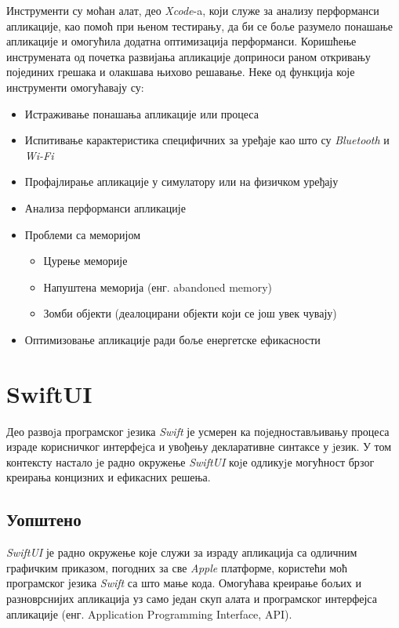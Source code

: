 \documentclass[12pt,oneside]{memoir}
\begin{document}
\indent Инструменти су моћан алат, део \textit{Xcode}-a, који служе за анализу перформанси апликације, као помоћ при њеном тестирању, да би се боље разумело понашање апликације и омогућила додатна оптимизација перформанси. Коришћење инструмената од почетка развијања апликације доприноси раном откривању појединих грешака и олакшава њихово решавање. 
Неке од функција које инструменти омогућавају су:
\begin{itemize}
    \item Истраживање понашања апликације или процеса
    \item Испитивање карактеристика специфичних за уређаје као што су \textit{Bluetooth} и \textit{Wi-Fi}
    \item Профајлирање апликације у симулатору или на физичком уређају
    \item Анализа перформанси апликације
    \item Проблеми са меморијом
    
    \begin{itemize}
        \item Цурење меморије
        \item Напуштена меморија (енг. abandoned memory)
        \item Зомби објекти (деалоцирани објекти који се још увек чувају)
    \end{itemize}
    
    \item Оптимизовање апликације ради боље енергетске ефикасности
\end{itemize}

\section{SwiftUI}
\label{sec:SwiftUI}

\indent Део развоjа програмског jезика \textit{Swift} је усмерен ка поjедностављивању процеса израде корисничког интерфеjса и увођењу декларативне синтаксе у jезик. У том контексту настало jе радно окружење \textit{SwiftUI} коjе одликуjе могућност брзог креирања концизних и ефикасних решења.

\subsection{Уопштено}

\indent \textit{SwiftUI} је радно окружење које служи за израду апликација са одличним графичким приказом, погодних за све \textit{Apple} платформе, користећи моћ програмског језика \textit{Swift} са што мање кода. Омогућава креирање бољих и разноврснијих апликација уз само један скуп алата и програмског интерфејса апликације (енг. Application Programming Interface, API). 
\end{document}
